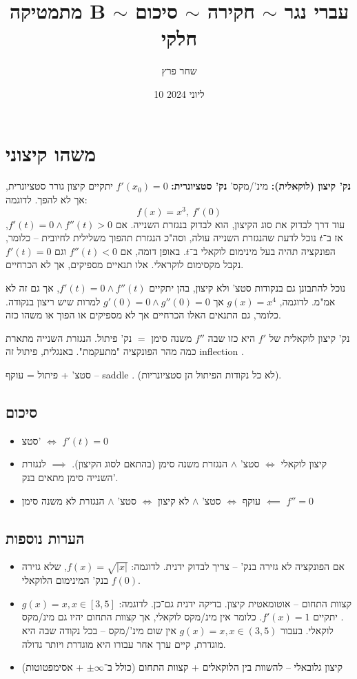 \documentclass[]{article}
\author{שחר פרץ}
\title{מתמטיקה B $\sim$ עברי נגר $\sim$ חקירה $\sim$ סיכום חלקי}
\date{10 ליוני 2024}
\newcommand\del   {$ \!\! $}
\renewcommand\inf {\infty}
\begin{document}
	\maketitle
	
	\section{משהו קיצוני}
	\textbf{נק' קיצון (לוקאלית): }מינ'/מקס'
	\textbf{נק' סטציונרית: }$f'(x_0) = 0$
	יתקיים קיצון גורר סטציונרית, אך לא להפך. לדוגמה: 
	\[ f(x) = x^{3}, \ f'(0) \]
	עוד דרך לבדוק את סוג הקיצון, הוא לבדוק בנגזרת השנייה. אם $f'(t) = 0 \land f''(t) > 0$, אז ב־$t$ נוכל לדעת שהנגזרת השנייה עולה, וסה"כ הנגזרת תהפוך משלילית לחיובית – כלומר, הפונקציה תהיה בעל מינימום לוקאלי ב־$t$. באופן דומה, אם $f''(t) < 0$ וגם $f'(t) = 0$ נקבל מקסימום לוקראלי. אלו תנאיים מספיקים, אך לא הכרחיים. 
	
	נוכל להתבונן גם בנקודות סטצ' ולא קיצון, בהן יתקיים $f'(t) = 0 \land f''(t)$, אך גם זה לא אמ"מ. לדוגמה, $g(x) = x^{4}$ אך $g'(0) = 0 \land g''(0) = 0$ למרות שיש ריצון בנקודה. כלומר, גם התנאים האלו הכרחיים אך לא מספיקים או הפוך או משהו כזה. 
	
	נק' קיצון לוקאלית של $f'$ היא כזו שבה $f''$ משנה סימן $=$ נק' פיתול. הנגזרת השנייה מתארת כמה מהר הפונקציה "מתעקמת". באנגלית, פיתול זה inflection \del. 
	
	סטצ' + פיתול = עוקף – saddle \del. (לא כל נקודות הפיתול הן סטציונריות). 
	
	\subsection{סיכום}
	\begin{itemize}
		\item סטצ' $\iff$ $f'(t) = 0$
		\item קיצון לוקאלי $\iff$ סטצ' $\land$ הנגזרת משנה סימן (בהתאם לסוג הקיצון). $\implies$ לנגזרת השנייה סימן מתאים בנק'. 
		\item עוקף $\iff$ סטצ' $\land$ לא קיצון $\iff$ סטצ' $\land$ הנגזרת לא משנה סימן $\impliedby$ $f'' = 0$
	\end{itemize}
	\subsection{הערות נוספות}
	
	\begin{itemize}
		\item אם הפונקציה לא גזירה בנק' – צריך לבדוק ידנית. 
		לדוגמה: $f(x) = \sqrt{|x|}$, שלא גזירה בנק' המינימום הלוקאלי $f(0)$. 
		\item 	קצוות התחום – אוטומאטית קיצון. בדיקה ידנית גם־כן. לדוגמה: $g(x) = x, x \in [3, 5]$. יתקיים $f'(x) = 1$. כלומר אין מינ/מקס לוקאלי, אך קצוות התחום יהיו גם מינ/מקס לוקאלי. בעבור $g(x) = x, x \in (3, 5)$ אין שום מינ'/מקס – בכל נקודה שבה היא מוגדרת, קיים ערך אחר עבורו היא מוגדרת ויותר גדולה. 
		\item 	קיצון גלובאלי – להשוות בין הלוקאלים + קצוות התחום (כולל ב־$\pm \inf$ + אסימפטוטות)
	\end{itemize}
	
\end{document}
